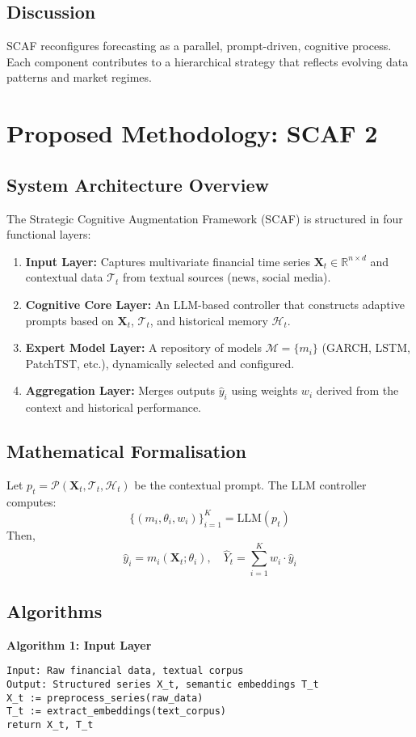 \documentclass[conference]{IEEEtran}
\begin{document}
\subsection{Discussion}
SCAF reconfigures forecasting as a parallel, prompt-driven, cognitive process. Each component contributes to a hierarchical strategy that reflects evolving data patterns and market regimes.

\section{Proposed Methodology: SCAF 2}

\subsection{System Architecture Overview}
The Strategic Cognitive Augmentation Framework (SCAF) is structured in four functional layers:
\begin{enumerate}
    \item \textbf{Input Layer:} Captures multivariate financial time series $\mathbf{X}_t \in \mathbb{R}^{n \times d}$ and contextual data $\mathcal{T}_t$ from textual sources (news, social media).
    \item \textbf{Cognitive Core Layer:} An LLM-based controller that constructs adaptive prompts based on $\mathbf{X}_t$, $\mathcal{T}_t$, and historical memory $\mathcal{H}_t$.
    \item \textbf{Expert Model Layer:} A repository of models $\mathcal{M} = \{m_i\}$ (GARCH, LSTM, PatchTST, etc.), dynamically selected and configured.
    \item \textbf{Aggregation Layer:} Merges outputs $\hat{y}_i$ using weights $w_i$ derived from the context and historical performance.
\end{enumerate}

\subsection{Mathematical Formalisation}
Let $p_t = \mathcal{P}(\mathbf{X}_t, \mathcal{T}_t, \mathcal{H}_t)$ be the contextual prompt. The LLM controller computes:
\[ \{(m_i, \theta_i, w_i)\}_{i=1}^K = \text{LLM}(p_t) \]
Then,
\[ \hat{y}_i = m_i(\mathbf{X}_t; \theta_i), \quad \hat{Y}_t = \sum_{i=1}^K w_i \cdot \hat{y}_i \]

\subsection{Algorithms}
\textbf{Algorithm 1: Input Layer}
\begin{verbatim}
Input: Raw financial data, textual corpus
Output: Structured series X_t, semantic embeddings T_t
X_t := preprocess_series(raw_data)
T_t := extract_embeddings(text_corpus)
return X_t, T_t
\end{verbatim}
\cite{tetlock2007giving, huang2023finbertplus}
\end{document}
